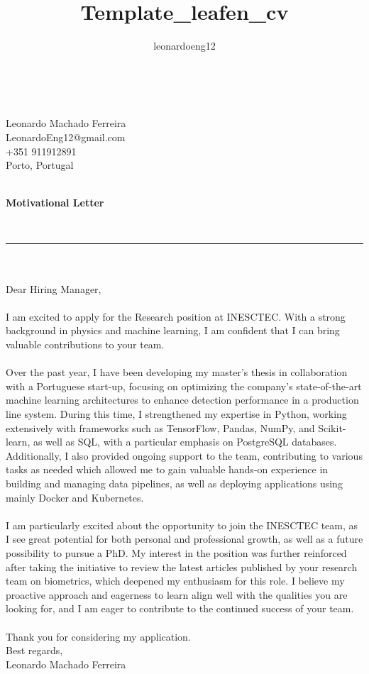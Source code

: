 \documentclass[11pt,a4paper]{article}
\title{Template_leafen_cv}
\author{leonardoeng12 }
\newcommand{\MonthYear}{\DTMdate{\the\month-\the\year}}
\begin{document}
	\begin{minipage}{0.6\textwidth}~\end{minipage}\hfill
	\begin{minipage}{0.35\textwidth}
		\begin{flushright}
			Leonardo Machado Ferreira\\
			LeonardoEng12@gmail.com\\
			+351 911912891\\
			Porto, Portugal
		\end{flushright}
	\end{minipage}\par
	\begin{minipage}{0.5\textwidth}
		\MonthYear\\
		\textbf{Motivational Letter}
	\end{minipage}\hfill
	\begin{minipage}{0.5\textwidth}~\end{minipage}\par
	\rule{\textwidth}{0.4pt}\\
	\\
	\noindent Dear Hiring Manager,\\
	\\
	I am excited to apply for the Research position at INESCTEC. With a strong background in physics and machine learning, I am confident that I can bring valuable contributions to your team.\\
	\\
	Over the past year, I have been developing my master’s thesis in collaboration with a Portuguese start-up, focusing on optimizing the company's state-of-the-art machine learning architectures to enhance detection performance in a production line system. During this time, I strengthened my expertise in Python, working extensively with frameworks such as TensorFlow, Pandas, NumPy, and Scikit-learn, as well as SQL, with a particular emphasis on PostgreSQL databases. Additionally, I also provided ongoing support to the team, contributing to various tasks as needed which allowed me to gain valuable hands-on experience in building and managing data pipelines, as well as deploying applications using mainly Docker and Kubernetes. \\
	\\
	I am particularly excited about the opportunity to join the INESCTEC team, as I see great potential for both personal and professional growth, as well as a future possibility to pursue a PhD. My interest in the position was further reinforced after taking the initiative to review the latest articles published by your research team on biometrics, which deepened my enthusiasm for this role. I believe my proactive approach and eagerness to learn align well with the qualities you are looking for, and I am eager to contribute to the continued success of your team.\\
	\\
	Thank you for considering my application.\\
	Best regards,\\
	Leonardo Machado Ferreira\\
	
\end{document}
